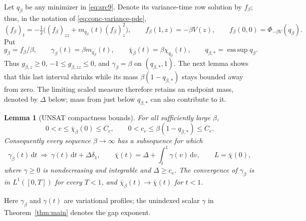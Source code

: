 \documentclass[11pt,a4paper]{article}
\numberwithin{equation}{section}
\newtheorem{lemma}[theorem]{Lemma}
\theoremstyle{definition}
\theoremstyle{remark}
\newcommand{\dd}{\mathrm d}
\DeclareMathOperator*{\esssup}{ess\,sup}
\begin{document}
Let \(q_\beta\) be any minimizer in \eqref{eq:src9}.  Denote its
variance-time row solution by $f_\beta$; thus, in the notation of
\eqref{eq:conc-variance-pde},
\[
 (f_\beta)_t=-\tfrac12\bigl((f_\beta)_{zz}
                  +m_{q_\beta}(t)(f_\beta)_z^2\bigr),\qquad
 f_\beta(1,z)=-\beta V(z),\qquad
 f_\beta(0,0)=\Phi_{-\beta V}(q_\beta).
\]
Put
\[
 g_\beta=f_\beta/\beta,\qquad
 \gamma_\beta(t)=\beta m_{q_\beta}(t),\qquad
 \bar\chi_\beta(t)=\beta\chi_{q_\beta}(t),\qquad
 q_{\beta,*}=\esssup q_\beta.
\]
Thus \(g_{\beta,z}\ge0\), \(-1\le g_{\beta,zz}\le0\), and
\(\gamma_\beta=\beta\) on \((q_{\beta,*},1)\).
The next lemma shows that this last interval shrinks while its mass
$\beta(1-q_{\beta,*})$ stays bounded away from zero.  The limiting
scaled measure therefore retains an endpoint mass, denoted by $\Delta$
below; mass from just below $q_{\beta,*}$ can also contribute to it.

\begin{lemma}[UNSAT compactness bounds]\label{zero:compactness}
For all sufficiently large \(\beta\),
\begin{equation}
 0<c\le\bar\chi_\beta(0)\le C_e,
 \qquad 0<c_e\le\beta(1-q_{\beta,*})\le C_e.
 \label{eq:src14}
\end{equation}
Consequently every sequence \(\beta\to\infty\) has a subsequence for which
\[
 \gamma_\beta(t)\,\dd t\ \Longrightarrow\
 \gamma(t)\,\dd t+\Delta\delta_1,
 \qquad
 \bar\chi(t)=\Delta+\int_t^1\gamma(v)\,\dd v,
 \qquad L=\bar\chi(0),
\]
where \(\gamma\ge0\) is nondecreasing and integrable and \(\Delta\ge c_e\).
The convergence of \(\gamma_\beta\) is in \(L^1([0,T])\) for every
\(T<1\), and \(\bar\chi_\beta(t)\to\bar\chi(t)\) for \(t<1\).
\end{lemma}

Here $\gamma_\beta$ and $\gamma(t)$ are variational profiles; the
unindexed scalar $\gamma$ in Theorem~\ref{thm:main} denotes the gap
exponent.
\end{document}
